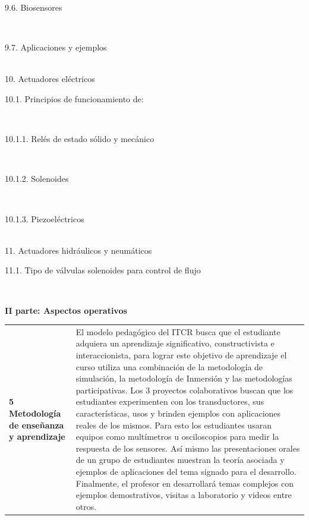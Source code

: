 \documentclass[letterpaper]{article}%
\begin{document}
\begin{tcolorbox}
\hspace*{0.02\linewidth}\parbox{0.98\linewidth}{\strut 9.6. Biosensores\strut}\\
\hspace*{0.02\linewidth}\parbox{0.98\linewidth}{\strut 9.7. Aplicaciones y ejemplos\strut}\\
10. Actuadores eléctricos \\
\hspace*{0.02\linewidth}\parbox{0.98\linewidth}{\strut 10.1. Principios de funcionamiento de:\strut}\\
\hspace*{0.04\linewidth}\parbox{0.96\linewidth}{\strut 10.1.1. Relés de estado sólido y mecánico\strut}\\
\hspace*{0.04\linewidth}\parbox{0.96\linewidth}{\strut 10.1.2. Solenoides\strut}\\
\hspace*{0.04\linewidth}\parbox{0.96\linewidth}{\strut 10.1.3. Piezoeléctricos\strut}\\
11. Actuadores hidráulicos y neumáticos\\
\hspace*{0.02\linewidth}\parbox{0.98\linewidth}{\strut 11.1. Tipo de válvulas solenoides para control de flujo\strut}\\ 
\end{tcolorbox}
%
\vspace*{10mm}%
\newpage%
\par\fontsize{14}{0}\selectfont \textbf{\textcolor{parte}{II parte: Aspectos operativos}}%
\par\fontsize{12}{0}\selectfont \textbf{\textcolor{parte}{ }}%
\renewcommand{\arraystretch}{1.5}%
\begin{tabularx}{\textwidth}{>{\raggedright}p{}p{}}%
\par\fontsize{12}{0}\selectfont \textbf{\textcolor{parte}{5 Metodología de enseñanza y aprendizaje}}&El modelo pedagógico del ITCR busca que el estudiante adquiera un aprendizaje significativo, constructivista e interaccionista, para lograr este objetivo de aprendizaje el curso utiliza una combinación de la metodología de simulación, la metodología de Inmersión y las metodologías participativas.
\newline%
Los 3 proyectos colaborativos buscan que los estudiantes experimenten con los transductores, sus características, usos y brinden ejemplos con aplicaciones reales de los mismos. Para esto los estudiantes usaran equipos como multímetros u osciloscopios para medir la respuesta de los sensores. Así mismo las presentaciones orales de un grupo de estudiantes muestran la teoría asociada y ejemplos de aplicaciones del tema signado para el desarrollo. Finalmente, el profesor en desarrollará temas complejos con ejemplos demostrativos, visitas a laboratorio y videos entre otros.\\%
\end{tabularx}%
\end{document}
